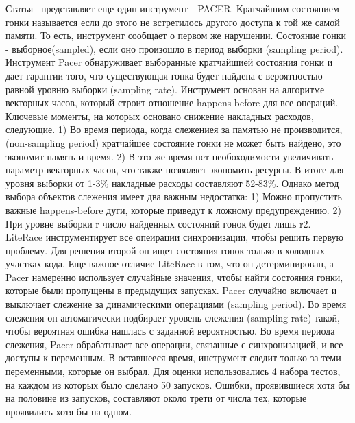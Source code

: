 Статья~\cite{Bond:2010:PLDI,Bond:2010} представляет еще один инструмент - PACER.
Кратчайшим состоянием гонки называется если до этого не встретилось другого доступа к той же самой памяти. То есть, инструмент сообщает о первом же нарушении. Состояние гонки - выборное(sampled), если оно произошло в период выборки (sampling period). Инструмент Pacer обнаруживает выборанные кратчайшией состояния гонки и дает гарантии того, что существующая гонка будет найдена с вероятностью равной уровню выборки (sampling rate). Инструмент основан на алгоритме векторных часов, который строит отношение happens-before для все операций. Ключевые моменты, на которых основано снижение накладных расходов, следующие. 
1) Во время периода, когда слежениея за памятью не производится, (non-sampling period) кратчайшее состояние гонки не может быть найдено, это экономит память и время.
2) В это же время нет необоходимости увеличивать параметр векторных часов, что также позволяет экономить ресурсы.
В итоге для уровня выборки от 1-3\% накладные расходы составляют 52-83\%.
Однако метод выбора объектов слежения имеет два важным недостатка:
1) Можно пропустить важные happens-before дуги, которые приведут к ложному предупреждению.
2) При уровне выборки r число найденных состояний гонок будет лишь r2. 
LiteRace инструментирует все опеирации синхронизации, чтобы решить первую проблему. Для решения второй он ищет состояния гонок только в холодных участках кода. Еще важное отличие LiteRace в том, что он детерминирован, а Pacer намеренно использует случайные значения, чтобы найти состояния гонки, которые были пропущены в предыдущих запусках.
Pacer случайно включает и выключает слежение за динамическими операциями (sampling period). Во время слежения он автоматически подбирает уровень слежения (sampling rate) такой, чтобы вероятная ошибка нашлась с заданной вероятностью. Во время периода слежения, Pacer обрабатывает все операции, связанные с синхронизацией, и все доступы к переменным. В оставшееся время, инструмент следит только за теми переменными, которые он выбрал.
Для оценки использовались 4 набора тестов, на каждом из которых было сделано 50 запусков. Ошибки, проявившиеся хотя бы на половине из запусков, составляют около трети от числа тех, которые проявились хотя бы на одном.

